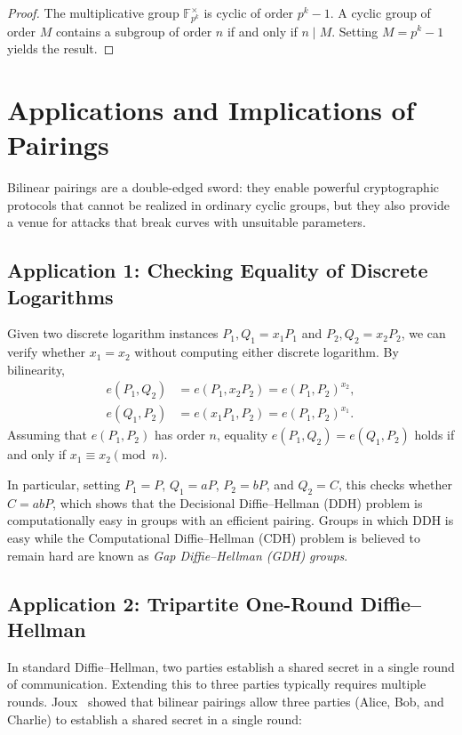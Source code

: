 \begin{proof}
    The multiplicative group \(\mathbb{F}_{p^k}^\times\) is cyclic of order \(p^k - 1\).
    A cyclic group of order \(M\) contains a subgroup of order \(n\) if and only if \(n \mid M\).
    Setting \(M = p^k - 1\) yields the result.
\end{proof}

\section*{Applications and Implications of Pairings}

Bilinear pairings are a double-edged sword: they enable powerful cryptographic protocols that cannot be realized in ordinary cyclic groups, but they also provide a venue for attacks that break curves with unsuitable parameters.

\subsection*{Application 1: Checking Equality of Discrete Logarithms}

Given two discrete logarithm instances \(P_1, Q_1 = x_1 P_1\) and \(P_2, Q_2 = x_2 P_2\), we can verify whether \(x_1 = x_2\) without computing either discrete logarithm.
By bilinearity,
\begin{align*}
    e(P_1, Q_2) &= e(P_1, x_2 P_2) = e(P_1, P_2)^{x_2}, \\
    e(Q_1, P_2) &= e(x_1 P_1, P_2) = e(P_1, P_2)^{x_1}.
\end{align*}
Assuming that \(e(P_1, P_2)\) has order \(n\), equality \(e(P_1, Q_2) = e(Q_1, P_2)\) holds if and only if \(x_1 \equiv x_2 \pmod{n}\).

In particular, setting \(P_1 = P\), \(Q_1 = aP\), \(P_2 = bP\), and \(Q_2 = C\), this checks whether \(C = abP\), which shows that the Decisional Diffie--Hellman (DDH) problem is computationally easy in groups with an efficient pairing.
Groups in which DDH is easy while the Computational Diffie--Hellman (CDH) problem is believed to remain hard are known as \emph{Gap Diffie--Hellman (GDH) groups}.

\subsection*{Application 2: Tripartite One-Round Diffie--Hellman}

In standard Diffie--Hellman, two parties establish a shared secret in a single round of communication.
Extending this to three parties typically requires multiple rounds.
Joux~\cite{Joux2004} showed that bilinear pairings allow three parties (Alice, Bob, and Charlie) to establish a shared secret in a single round:


